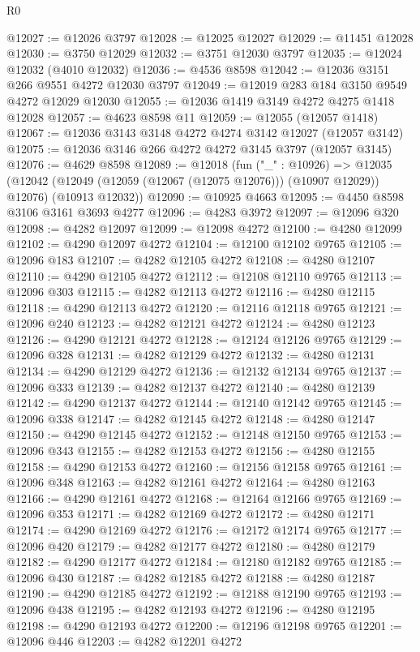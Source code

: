 \begin{lexlean}{R0}
\begin{coremodule}
@12027 := @12026 @3797
@12028 := @12025 @12027
@12029 := @11451 @12028
@12030 := @3750 @12029
@12032 := @3751 @12030 @3797
@12035 := @12024 @12032 (@4010 @12032)
@12036 := @4536 @8598
@12042 := @12036 @3151 @266 @9551 @4272 @12030 @3797
@12049 := @12019 @283 @184 @3150 @9549 @4272 @12029 @12030
@12055 := @12036 @1419 @3149 @4272 @4275 @1418 @12028
@12057 := @4623 @8598 @11
@12059 := @12055 (@12057 @1418)
@12067 := @12036 @3143 @3148 @4272 @4274 @3142 @12027 (@12057 @3142)
@12075 := @12036 @3146 @266 @4272 @4272 @3145 @3797 (@12057 @3145)
@12076 := @4629 @8598
@12089 := @12018
    (fun ("_" : @10926) =>
    @12035
      (@12042 (@12049 (@12059 (@12067 (@12075 @12076))) (@10907 @12029)) @12076)
      (@10913 @12032))
@12090 := @10925 @4663
@12095 := @4450 @8598 @3106 @3161 @3693 @4277
@12096 := @4283 @3972
@12097 := @12096 @320
@12098 := @4282 @12097
@12099 := @12098 @4272
@12100 := @4280 @12099
@12102 := @4290 @12097 @4272
@12104 := @12100 @12102 @9765
@12105 := @12096 @183
@12107 := @4282 @12105 @4272
@12108 := @4280 @12107
@12110 := @4290 @12105 @4272
@12112 := @12108 @12110 @9765
@12113 := @12096 @303
@12115 := @4282 @12113 @4272
@12116 := @4280 @12115
@12118 := @4290 @12113 @4272
@12120 := @12116 @12118 @9765
@12121 := @12096 @240
@12123 := @4282 @12121 @4272
@12124 := @4280 @12123
@12126 := @4290 @12121 @4272
@12128 := @12124 @12126 @9765
@12129 := @12096 @328
@12131 := @4282 @12129 @4272
@12132 := @4280 @12131
@12134 := @4290 @12129 @4272
@12136 := @12132 @12134 @9765
@12137 := @12096 @333
@12139 := @4282 @12137 @4272
@12140 := @4280 @12139
@12142 := @4290 @12137 @4272
@12144 := @12140 @12142 @9765
@12145 := @12096 @338
@12147 := @4282 @12145 @4272
@12148 := @4280 @12147
@12150 := @4290 @12145 @4272
@12152 := @12148 @12150 @9765
@12153 := @12096 @343
@12155 := @4282 @12153 @4272
@12156 := @4280 @12155
@12158 := @4290 @12153 @4272
@12160 := @12156 @12158 @9765
@12161 := @12096 @348
@12163 := @4282 @12161 @4272
@12164 := @4280 @12163
@12166 := @4290 @12161 @4272
@12168 := @12164 @12166 @9765
@12169 := @12096 @353
@12171 := @4282 @12169 @4272
@12172 := @4280 @12171
@12174 := @4290 @12169 @4272
@12176 := @12172 @12174 @9765
@12177 := @12096 @420
@12179 := @4282 @12177 @4272
@12180 := @4280 @12179
@12182 := @4290 @12177 @4272
@12184 := @12180 @12182 @9765
@12185 := @12096 @430
@12187 := @4282 @12185 @4272
@12188 := @4280 @12187
@12190 := @4290 @12185 @4272
@12192 := @12188 @12190 @9765
@12193 := @12096 @438
@12195 := @4282 @12193 @4272
@12196 := @4280 @12195
@12198 := @4290 @12193 @4272
@12200 := @12196 @12198 @9765
@12201 := @12096 @446
@12203 := @4282 @12201 @4272

\end{coremodule}
\end{lexlean}
